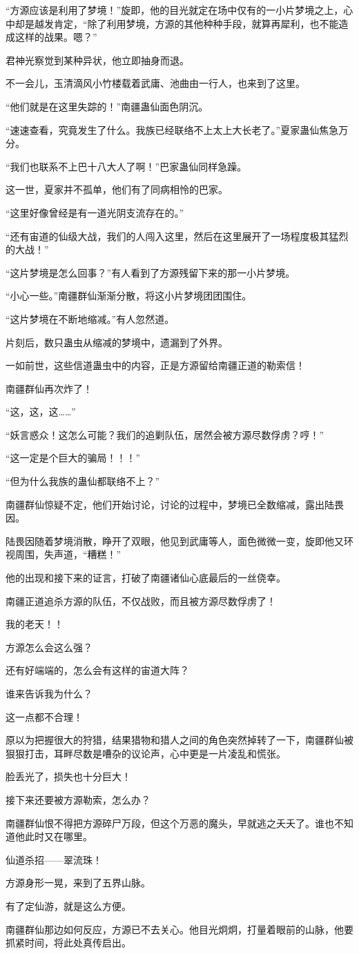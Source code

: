 \begin{this_body}
“方源应该是利用了梦境！”旋即，他的目光就定在场中仅有的一小片梦境之上，心中却是越发肯定，“除了利用梦境，方源的其他种种手段，就算再犀利，也不能造成这样的战果。嗯？”

君神光察觉到某种异状，他立即抽身而退。

不一会儿，玉清滴风小竹楼载着武庸、池曲由一行人，也来到了这里。

“他们就是在这里失踪的！”南疆蛊仙面色阴沉。

“速速查看，究竟发生了什么。我族已经联络不上太上大长老了。”夏家蛊仙焦急万分。

“我们也联系不上巴十八大人了啊！”巴家蛊仙同样急躁。

这一世，夏家并不孤单，他们有了同病相怜的巴家。

“这里好像曾经是有一道光阴支流存在的。”

“还有宙道的仙级大战，我们的人闯入这里，然后在这里展开了一场程度极其猛烈的大战！”

“这片梦境是怎么回事？”有人看到了方源残留下来的那一小片梦境。

“小心一些。”南疆群仙渐渐分散，将这小片梦境团团围住。

“这片梦境在不断地缩减。”有人忽然道。

片刻后，数只蛊虫从缩减的梦境中，遗漏到了外界。

一如前世，这些信道蛊虫中的内容，正是方源留给南疆正道的勒索信！

南疆群仙再次炸了！

“这，这，这……”

“妖言惑众！这怎么可能？我们的追剿队伍，居然会被方源尽数俘虏？哼！”

“这一定是个巨大的骗局！！！”

“但为什么我族的蛊仙都联络不上？”

南疆群仙惊疑不定，他们开始讨论，讨论的过程中，梦境已全数缩减，露出陆畏因。

陆畏因随着梦境消散，睁开了双眼，他见到武庸等人，面色微微一变，旋即他又环视周围，失声道，“糟糕！”

他的出现和接下来的证言，打破了南疆诸仙心底最后的一丝侥幸。

南疆正道追杀方源的队伍，不仅战败，而且被方源尽数俘虏了！

我的老天！！

方源怎么会这么强？

还有好端端的，怎么会有这样的宙道大阵？

谁来告诉我为什么？

这一点都不合理！

原以为把握很大的狩猎，结果猎物和猎人之间的角色突然掉转了一下，南疆群仙被狠狠打击，耳畔尽数是嘈杂的议论声，心中更是一片凌乱和慌张。

脸丢光了，损失也十分巨大！

接下来还要被方源勒索，怎么办？

南疆群仙恨不得把方源碎尸万段，但这个万恶的魔头，早就逃之夭夭了。谁也不知道他此时又在哪里。

仙道杀招——翠流珠！

方源身形一晃，来到了五界山脉。

有了定仙游，就是这么方便。

南疆群仙那边如何反应，方源已不去关心。他目光炯炯，打量着眼前的山脉，他要抓紧时间，将此处真传启出。

\end{this_body}

